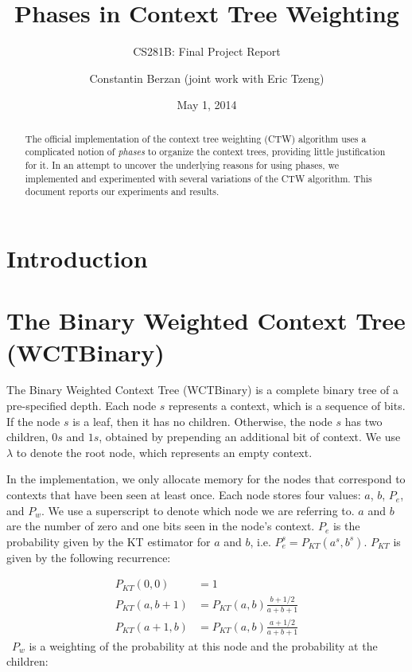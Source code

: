 \documentclass[11pt]{scrartcl}
\title{Phases in Context Tree Weighting}
\subtitle{CS281B: Final Project Report}
\author{Constantin Berzan (joint work with Eric Tzeng)}
\date{May 1, 2014}
\begin{document}
\maketitle

\begin{abstract}
The official implementation of the context tree weighting (CTW) algorithm uses
a complicated notion of {\em phases} to organize the context trees, providing
little justification for it. In an attempt to uncover the underlying reasons
for using phases, we implemented and experimented with several variations of
the CTW algorithm. This document reports our experiments and results.
\end{abstract}

\section{Introduction}


\section{The Binary Weighted Context Tree (WCTBinary)}

The Binary Weighted Context Tree (WCTBinary) is a complete binary tree of a
pre-specified depth. Each node $s$ represents a context, which is a sequence of
bits. If the node $s$ is a leaf, then it has no children. Otherwise, the node
$s$ has two children, $0s$ and $1s$, obtained by prepending an additional bit
of context.  We use $\lambda$ to denote the root node, which represents an
empty context.

In the implementation, we only allocate memory for the nodes that correspond to
contexts that have been seen at least once. Each node stores four values: $a$,
$b$, $P_e$, and $P_w$. We use a superscript to denote which node we are
referring to. $a$ and $b$ are the number of zero and one bits seen in the
node's context. $P_e$ is the probability given by the KT estimator for $a$ and
$b$, i.e. $P_e^s = P_{KT}(a^s, b^s)$. $P_{KT}$ is given by the following
recurrence:

\begin{align*}
P_{KT}(0, 0)   &= 1 \\
P_{KT}(a, b+1) &= P_{KT}(a, b) \frac{b + 1/2}{a + b + 1} \\
P_{KT}(a+1, b) &= P_{KT}(a, b) \frac{a + 1/2}{a + b + 1}
\end{align*}
\
$P_w$ is a weighting of the probability at this node and the probability at the
children:
\end{document}
